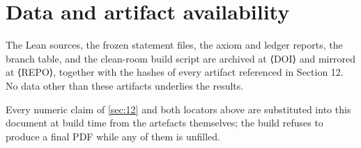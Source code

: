 \section*{Data and artifact availability}
The Lean sources, the frozen statement files, the axiom and ledger reports, the branch table, and the clean-room build script are archived at ⟨DOI⟩ and mirrored at ⟨REPO⟩, together with the hashes of every artifact referenced in Section 12. No data other than these artifacts underlies the results.

Every numeric claim of \cref{sec:12} and both locators above are substituted into this document at build time from the artefacts themselves; the build refuses to produce a final PDF while any of them is unfilled.

\appendix
